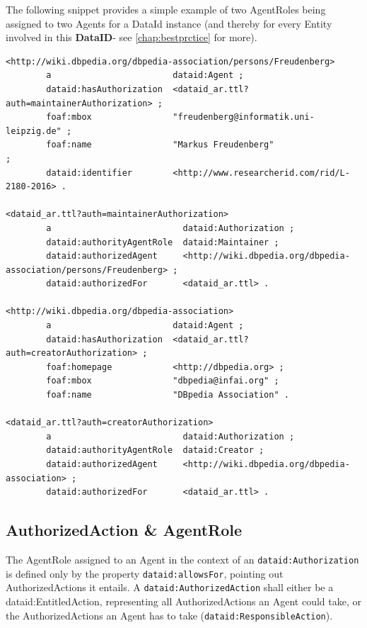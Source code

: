 \documentclass[a4paper,english,twoside,BCOR1.5cm,headsepline,DIV12,appendixprefix,final,12pt]{scrbook}
\newcommand{\dataid}{{\ttfamily\bfseries DataID}\xspace}
\newcommand{\prop}[1]{{{\texttt{#1}}}}
\begin{document}
The following snippet provides a simple example of two AgentRoles being assigned to two Agents for a DataId instance (and thereby for every Entity involved in this \dataid  - see \cref{chap:bestprctice} for more).
\\
\begin{lstlisting}[language=ttl, captionpos=b,caption=Example of an organisation,label=lst:coresuperset,linewidth=\columnwidth,breaklines=true]
<http://wiki.dbpedia.org/dbpedia-association/persons/Freudenberg>
        a                        dataid:Agent ;                                               
        dataid:hasAuthorization  <dataid_ar.ttl?auth=maintainerAuthorization> ;
        foaf:mbox                "freudenberg@informatik.uni-leipzig.de" ;
        foaf:name                "Markus Freudenberg"                     ;
        dataid:identifier        <http://www.researcherid.com/rid/L-2180-2016> .              

<dataid_ar.ttl?auth=maintainerAuthorization>
        a                          dataid:Authorization ;                                     
        dataid:authorityAgentRole  dataid:Maintainer ;                                        
        dataid:authorizedAgent     <http://wiki.dbpedia.org/dbpedia-association/persons/Freudenberg> ;
        dataid:authorizedFor       <dataid_ar.ttl> .                                          

<http://wiki.dbpedia.org/dbpedia-association>
        a                        dataid:Agent ;                                               
        dataid:hasAuthorization  <dataid_ar.ttl?auth=creatorAuthorization> ;
        foaf:homepage            <http://dbpedia.org> ;
        foaf:mbox                "dbpedia@infai.org" ;
        foaf:name                "DBpedia Association" .

<dataid_ar.ttl?auth=creatorAuthorization>
        a                          dataid:Authorization ;
        dataid:authorityAgentRole  dataid:Creator ;                                           
        dataid:authorizedAgent     <http://wiki.dbpedia.org/dbpedia-association> ;
        dataid:authorizedFor       <dataid_ar.ttl> .
\end{lstlisting}

\subsection{AuthorizedAction \& AgentRole} 
\label{sec:coreaction}
The AgentRole assigned to an Agent in the context of an \prop{dataid:Authorization} is defined only by the property \prop{dataid:allowsFor}, pointing out AuthorizedActions it entails. A \prop{dataid:AuthorizedAction} shall either be a dataid:EntitledAction, representing all AuthorizedActions an Agent could take, or the AuthorizedActions an Agent has to take (\prop{dataid:ResponsibleAction}). 
\end{document}
